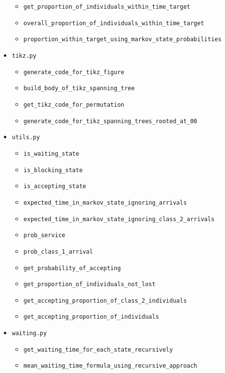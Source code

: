 \begin{itemize}
\begin{itemize}
        \item \texttt{get\_proportion\_of\_individuals\_within\_time\_target}
        \item \texttt{overall\_proportion\_of\_individuals\_within\_time\_target}
        \item \texttt{proportion\_within\_target\_using\_markov\_state\_probabilities}
    \end{itemize}
    \item \texttt{tikz.py}
    \begin{itemize}
        \item \texttt{generate\_code\_for\_tikz\_figure}
        \item \texttt{build\_body\_of\_tikz\_spanning\_tree}
        \item \texttt{get\_tikz\_code\_for\_permutation}
        \item \texttt{generate\_code\_for\_tikz\_spanning\_trees\_rooted\_at\_00}
    \end{itemize}
    \item \texttt{utils.py}
    \begin{itemize}
        \item \texttt{is\_waiting\_state}
        \item \texttt{is\_blocking\_state}
        \item \texttt{is\_accepting\_state}
        \item \texttt{expected\_time\_in\_markov\_state\_ignoring\_arrivals}
        \item \texttt{expected\_time\_in\_markov\_state\_ignoring\_class\_2\_arrivals}
        \item \texttt{prob\_service}
        \item \texttt{prob\_class\_1\_arrival}
        \item \texttt{get\_probability\_of\_accepting}
        \item \texttt{get\_proportion\_of\_individuals\_not\_lost}
        \item \texttt{get\_accepting\_proportion\_of\_class\_2\_individuals}
        \item \texttt{get\_accepting\_proportion\_of\_individuals}
    \end{itemize}
    \item \texttt{waiting.py}
    \begin{itemize}
        \item \texttt{get\_waiting\_time\_for\_each\_state\_recursively}
        \item \texttt{mean\_waiting\_time\_formula\_using\_recursive\_approach}

\end{itemize}
\end{itemize}
